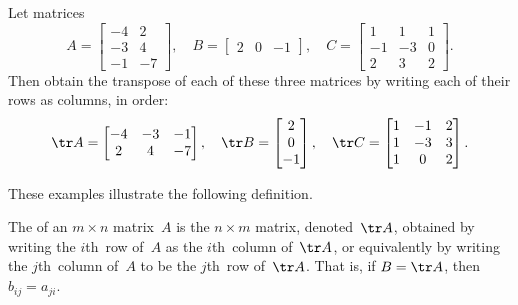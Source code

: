 \begin{example} \label{eg:mattrans}
Let matrices
\begin{equation*}
A=\begin{bmatrix} -4 & 2\\ -3 & 4\\ -1 & -7 \end{bmatrix},\quad
B=\begin{bmatrix} 2 & 0 & -1 \end{bmatrix},\quad
C=\begin{bmatrix} 1 & 1 & 1\\ -1 & -3 & 0\\ 2 & 3 & 2 \end{bmatrix}.
\end{equation*}
Then obtain the transpose of each of these three matrices by writing each of their rows as columns, in order:
\begin{equation*}
\tr A=\begin{bmatrix} -4 & -3 & -1\\ 2 & 4 & -7 \end{bmatrix},\quad
\tr B=\begin{bmatrix} 2\\ 0\\ -1 \end{bmatrix},\quad
\tr C=\begin{bmatrix} 1 & -1 & 2\\ 1 & -3 & 3\\ 1 & 0 & 2 \end{bmatrix}.
\end{equation*}
\end{example}

These examples illustrate the following definition. 
\begin{definition}[transpose] \label{def:mattran}
The  of an \(m\times n\) matrix~\(A\) is the \(n\times m\) matrix, denoted~\(\tr A\), obtained by writing the \(i\)th~row of~\(A\) as the \(i\)th~column of~\(\tr A\), or equivalently by writing the \(j\)th~column of~\(A\) to be the \(j\)th~row of~\(\tr A\).
That is, if \(B=\tr A\), then \(b_{ij}=a_{ji}\).
\end{definition}



